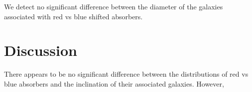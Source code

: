 \documentclass[iop]{emulateapj-rtx4}
\begin{document}




We detect no significant difference between the diameter of the galaxies associated with red vs blue shifted absorbers.


\section{Discussion}


There appears to be no significant difference between the distributions of red vs blue absorbers and the inclination of their associated galaxies. However, 
\end{document}
